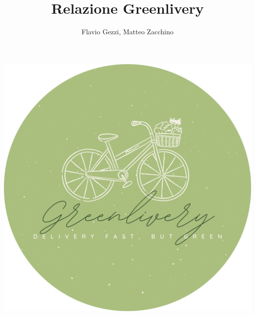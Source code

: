 \documentclass{article}
\begin{document}
\begin{center}
\includegraphics[width=\textwidth]{Data/logocircle.png}
\title{Relazione Greenlivery}
\author{Flavio Gezzi, Matteo Zacchino}
\end{center}
\renewcommand{\contentsname}{Indice}

\maketitle
\tableofcontents
\newpage
\end{document}
